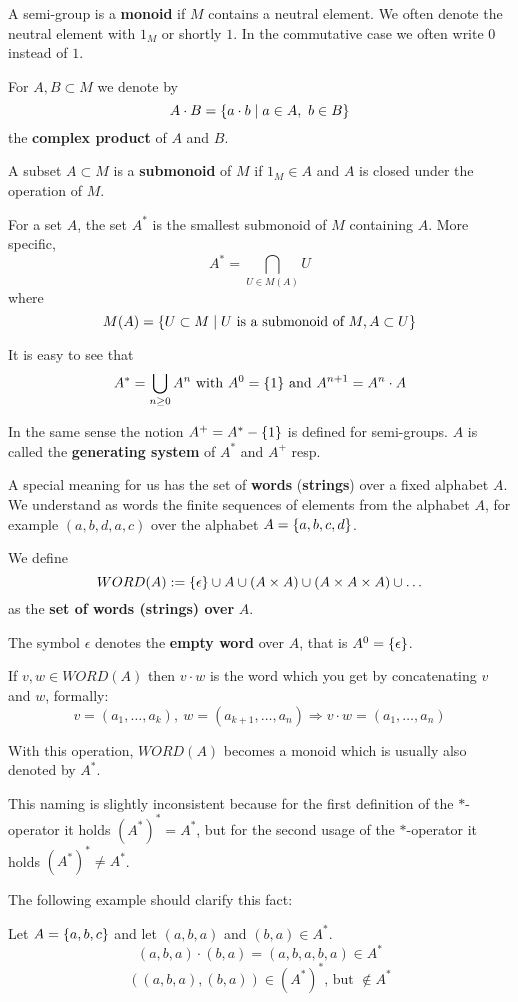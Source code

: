 A semi-group is a {\bf monoid} if $M$ contains a neutral element. We often
denote the neutral element with $1_M$ or shortly $1$. In the commutative case we
often write $0$ instead of $1$.

For $A,B \subset M$ we denote by 
\[ A \cdot B = \mbox{$\{a \cdot b \mid a \in A,\ b \in B \}$}\]
the {\bf complex product} of $A$ and $B$.

A subset $A \subset M$ is a {\bf submonoid} of $M$ if $1_M \in A$ and $A$ is
closed under the operation of $M$.

For a set $A$, the set $A^*$ is the smallest submonoid of $M$ containing $A$.
More specific, 
\[ A^* = \bigcap_{U \in M(A)} U	\]
where 
\[ M(A) = \mbox{$\{U \subset M \mid U \text{ is a submonoid of } M, A \subset U \}$} \]

It is easy to see that
\[ A^* = \bigcup_{n \geq 0} A^n \text{ with }A^0 = \mbox{$\{1\}$}\text{ and }A^{n+1}= A^n \cdot A \]

In the same sense the notion $A^+ = A^* - \mbox{$\{1\}$}$ is defined for semi-groups.
$A$ is called the {\bf generating system} of $A^*$ and $A^+$ resp.

A special meaning for us has the set of {\bf words} ({\bf strings}) over
a fixed alphabet $A$. We understand as words the finite sequences of elements from
the alphabet $A$, for example $(a,b,d,a,c)$ over the alphabet $A = \mbox{$\{a,b,c,d
\}$}$.

We define
\[ WORD(A) := \mbox{$\{\epsilon\}$} \cup A \cup (A \times A) \cup (A \times A \times
A) \cup \ldots \]
as the {\bf set of words (strings) over} $A$. 

The symbol $\epsilon$ denotes the {\bf empty word} over $A$, that is $A^0 =
\mbox{$\{\epsilon\}$}$.

If $v, w \in WORD(A)$ then $v \cdot w$ is the word which you get by
concatenating $v$ and $w$, formally:
\[ v = (a_1,\ldots, a_k),\ w = (a_{k+1}, \ldots, a_n) \Rightarrow v \cdot
w = (a_1, \ldots, a_n) \]

With this operation, $WORD(A)$ becomes a monoid which is usually also denoted
by $A^*$.

This naming is slightly inconsistent because for the first definition of
the $*$-operator it holds $(A^*)^* = A^*$, but for the second usage of the
$*$-operator it holds $(A^*)^* \neq A^*$.

The following example should clarify this fact: 

Let $A = \mbox{$\{a,b,c\}$}$ and let $(a,b,a)$ and $(b,a) \in A^*$.
\[(a,b,a)\cdot(b,a) = (a,b,a,b,a) \in A^* \]
\[((a,b,a),(b,a)) \in (A^*)^*\text{, but }\notin A^* \]

